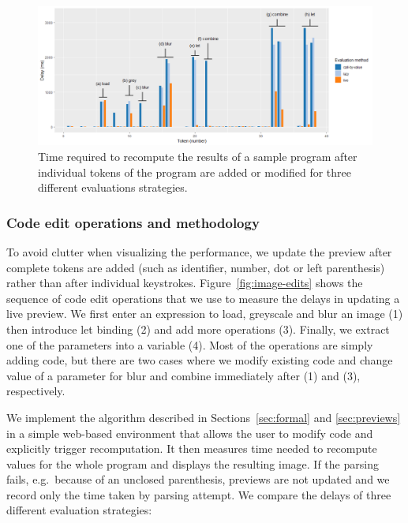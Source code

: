 \documentclass[english,submission]{programming}
\theoremstyle{plain}
\theoremstyle{definition}
\newcommand{\ident}[1]{\textnormal{\textcolor{idclr}{\sffamily #1}}}
\begin{document}

\begin{figure}[t]
\vspace{-0.5em}
\includegraphics[scale=0.425]{figures/drawing.png}
\caption{Time required to recompute the results of a sample program after individual tokens of
  the program are added or modified for three different evaluations strategies.}
\label{fig:drawing}
\vspace{-0.5em}
\end{figure}


\subsubsection{Code edit operations and methodology}

To avoid clutter when visualizing the performance, we update the preview after complete tokens are
added (such as identifier, number, dot or left parenthesis) rather than after individual keystrokes.
Figure~\ref{fig:image-edits} shows the sequence of code edit operations that we use to measure
the delays in updating a live preview. We first enter an expression to load, greyscale and blur
an image (1) then introduce let binding (2) and add more operations (3). Finally, we extract
one of the parameters into a variable (4). Most of the operations are simply adding code, but
there are two cases where we modify existing code and change value of a parameter for \ident{blur}
and \ident{combine} immediately after (1) and (3), respectively.

We implement the algorithm described in Sections~\ref{sec:formal} and \ref{sec:previews} in a
simple web-based environment that allows the user to modify code and explicitly trigger
recomputation. It then measures time needed to recompute values for the whole program and
displays the resulting image. If the parsing fails, e.g.~because of an unclosed parenthesis,
previews are not updated and we record only the time taken by parsing attempt. We compare the
delays of three different evaluation strategies:
\end{document}
